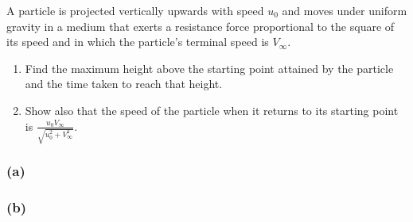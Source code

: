 \documentclass[main.tex]{subfiles}
\begin{document}
\begin{q}{2}
A particle is projected vertically upwards with speed $u_0$ and moves under uniform gravity in a medium that exerts a resistance force proportional to the square of its speed and in which the particle's terminal speed is $V_{\infty}$.
\begin{enumerate}[label=\textbf{(\alph*)}]
    \item Find the maximum height above the starting point attained by the particle and the time taken to reach that height.
    \item Show also that the speed of the particle when it returns to its starting point is $\displaystyle \frac{u_0V_{\infty}}{\sqrt{u_0^2 + V_{\infty}^2}}$.
\end{enumerate}
\end{q}

\begin{sol}
\subsubsection*{(a)}

\subsubsection*{(b)}
\end{sol}
\end{document}
